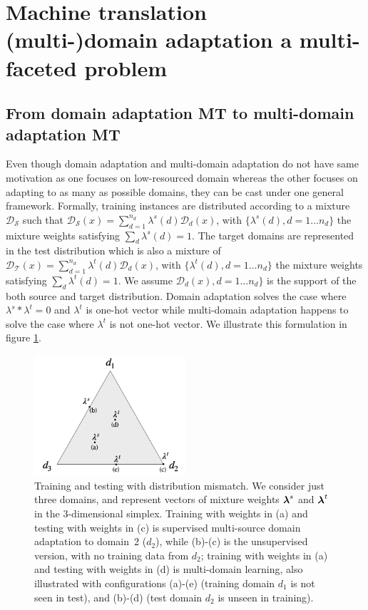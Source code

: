 \section{Machine translation (multi-)domain adaptation a multi-faceted problem}
\label{sec:multi-facet}
\subsection{From domain adaptation MT to multi-domain adaptation MT}
Even though domain adaptation and multi-domain adaptation do not have same motivation as one focuses on low-resourced domain whereas the other focuses on adapting to as many as possible domains, they can be cast under one general framework. Formally, training instances are distributed according to a mixture $\mathcal{D_S}$ such that $\mathcal{D_S}(x) = \sum_{d=1}^{n_d} \lambda^{s}(d) \mathcal{D}_d(x)$, with $\{\lambda^{s}(d), d=1 \dots n_d\}$ the mixture weights satisfying $\sum_d \lambda^{s}(d)=1$. The target domains are represented in the test distribution which is also a mixture of $\mathcal{D_T}(x) = \sum_{d=1}^{n_d} \lambda^{t}(d) \mathcal{D}_d(x)$, with $\{\lambda^{t}(d), d=1 \dots n_d\}$ the mixture weights satisfying $\sum_d \lambda^{t}(d)=1$. We assume $\mathcal{D}_d(x), d=1 \dots n_d\}$ is the support of the both source and target distribution. Domain adaptation solves the case where $\lambda^s * \lambda^t = 0$ and $\lambda^t$ is one-hot vector while multi-domain adaptation happens to solve the case where $\lambda^t$ is not one-hot vector. We illustrate this formulation in figure \ref{fig:mdmt-lambdas}.
\begin{figure}[h]
  \centering
  \includegraphics[width=0.5\textwidth]{graphics/mdmt-lambdas}
  \caption[Training and testing with distribution mismatch]{Training and testing with distribution mismatch. We consider just three domains, and represent vectors of mixture weights $\boldsymbol\lambda^{s}$ and $\boldsymbol\lambda^{t}$ in the 3-dimensional simplex. Training with weights in (a) and testing with weights in (c) is supervised multi-source domain adaptation to domain~2 ($d_2$), while (b)-(c) is the unsupervised version, with no training data from $d_2$; training with weights in (a) and testing with weights in (d) is multi-domain learning, also illustrated with configurations (a)-(e) (training domain $d_1$ is not seen in test), and (b)-(d)  (test domain $d_2$ is unseen in training).}
  \label{fig:mdmt-lambdas}
\end{figure}

